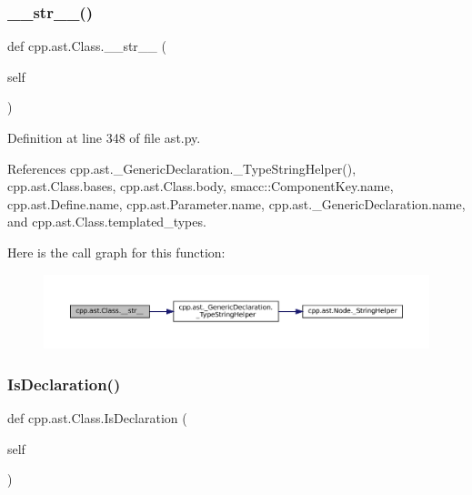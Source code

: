 \subsubsection{\texorpdfstring{\+\_\+\+\_\+str\+\_\+\+\_\+()}{\_\_str\_\_()}}
{\footnotesize\ttfamily def cpp.\+ast.\+Class.\+\_\+\+\_\+str\+\_\+\+\_\+ (\begin{DoxyParamCaption}\item[{}]{self }\end{DoxyParamCaption})}



Definition at line 348 of file ast.\+py.



References cpp.\+ast.\+\_\+\+Generic\+Declaration.\+\_\+\+Type\+String\+Helper(), cpp.\+ast.\+Class.\+bases, cpp.\+ast.\+Class.\+body, smacc\+::\+Component\+Key.\+name, cpp.\+ast.\+Define.\+name, cpp.\+ast.\+Parameter.\+name, cpp.\+ast.\+\_\+\+Generic\+Declaration.\+name, and cpp.\+ast.\+Class.\+templated\+\_\+types.


Here is the call graph for this function\+:
\nopagebreak
\begin{figure}[H]
\begin{center}
\leavevmode
\includegraphics[width=350pt]{classcpp_1_1ast_1_1Class_a0a63f6fab75d61ffac6fb9f1c29ae84d_cgraph}
\end{center}
\end{figure}
\mbox{\label{classcpp_1_1ast_1_1Class_a4758bfb7c00410575932974e1ed8b7da}} 
\subsubsection{\texorpdfstring{Is\+Declaration()}{IsDeclaration()}}
{\footnotesize\ttfamily def cpp.\+ast.\+Class.\+Is\+Declaration (\begin{DoxyParamCaption}\item[{}]{self }\end{DoxyParamCaption})}



